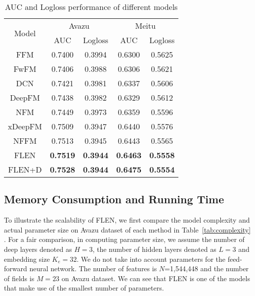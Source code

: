 \documentclass[sigconf]{acmart}
\begin{document}
\begin{table}[!htbp]
\centering\caption{AUC and Logloss performance of different models}
\begin{tabular}{|c|c|c|c|c|} \hline
\multirow{2}{*}{Model} & \multicolumn{2}{|c|}{Avazu} & \multicolumn{2}{|c|}{Meitu} \\ \cline{2-5}
& AUC & Logloss & AUC & Logloss \\ \hline
FFM  & 0.7400 & 0.3994 & 0.6300 & 0.5625 \\
FwFM  & 0.7406 & 0.3988 & 0.6306 & 0.5621 \\
DCN  & 0.7421 & 0.3981 & 0.6337 & 0.5606 \\
DeepFM  & 0.7438 & 0.3982 & 0.6329 & 0.5612 \\
NFM  & 0.7449 & 0.3973 & 0.6359 & 0.5596 \\
xDeepFM & 0.7509 & 0.3947 & 0.6440 & 0.5576 \\
NFFM & 0.7513 & 0.3945 & 0.6443 & 0.5565 \\
FLEN  & \textbf{0.7519} & \textbf{0.3944} & \textbf{0.6463} & \textbf{0.5558}\\ 
FLEN+D & \textbf{0.7528} & \textbf{0.3944} & \textbf{0.6475} & \textbf{0.5554}\\\hline
\end{tabular}
\label{tab:results}
\end{table}


\subsection{Memory Consumption and Running Time}

To illustrate the scalability of FLEN, we first compare the model complexity and actual parameter size on Avazu dataset of each method in Table~\ref{tab:complexity} . 
For a fair comparison, in computing parameter size, we assume the number of deep layers denoted as $H=3$, the number of hidden layers denoted as $L=3$ and embedding size $K_e=32$. We do not take into account parameters for the feed-forward neural network. 
The number of features is $N$=1,544,448 and the number of fields is $M=23$ on Avazu dataset.
We can see that FLEN is one of the models that make use of the smallest number of parameters. 
\end{document}
